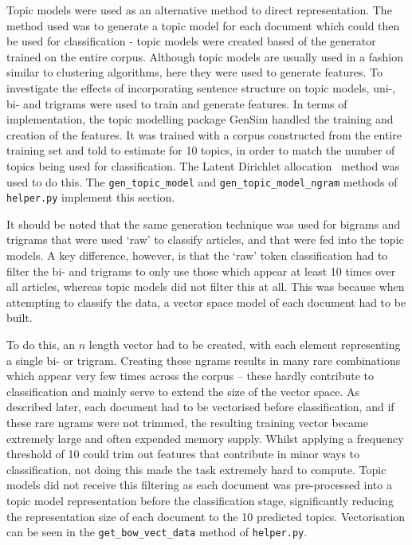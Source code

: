 \documentclass[11pt]{article}
\begin{document}
Topic models were used as an alternative method to direct representation. The method used was to generate a topic model for each document which could then be used for classification - topic models were created based of the generator trained on the entire corpus. Although topic models are usually used in a fashion similar to clustering algorithms, here they were used to generate features. To investigate the effects of incorporating sentence structure on topic models, uni-, bi- and trigrams were used to train and generate features. In terms of implementation, the topic modelling package GenSim handled the training and creation of the features. It was trained with a corpus constructed from the entire training set and told to estimate for 10 topics, in order to match the number of topics being used for classification. The Latent Dirichlet allocation~\cite{lda} method was used to do this. The \texttt{gen\_topic\_model} and \texttt{gen\_topic\_model\_ngram} methods of \texttt{helper.py} implement this section.

It should be noted that the same generation technique was used for bigrams and trigrams that were used `raw' to classify articles, and that were fed into the topic models. A key difference, however, is that the `raw' token classification had to filter the bi- and trigrams to only use those which appear at least 10 times over all articles, whereas topic models did not filter this at all. This was because when attempting to classify the data, a vector space model of each document had to be built. 

To do this, an $n$ length vector had to be created, with each element representing a single bi- or trigram. Creating these ngrams results in many rare combinations which appear very few times across the corpus – these hardly contribute to classification and mainly serve to extend the size of the vector space. As described later, each document had to be vectorised before classification, and if these rare ngrams were not trimmed, the resulting training vector became extremely large and often expended memory supply. Whilst applying a frequency threshold of 10 could trim out features that contribute in minor ways to classification, not doing this made the task extremely hard to compute. Topic models did not receive this filtering as each document was pre-processed into a topic model representation before the classification stage, significantly reducing the representation size of each document to the 10 predicted topics. Vectorisation can be seen in the \texttt{get\_bow\_vect\_data} method of \texttt{helper.py}.
\end{document}
